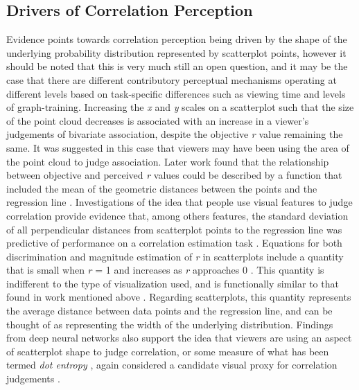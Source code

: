 \documentclass[manuscript, review, anonymous, screen]{acmart}
\begin{document}
\hypertarget{sec-drivers}{%
\subsection{Drivers of Correlation Perception}\label{sec-drivers}}

Evidence points towards correlation perception being driven by the shape
of the underlying probability distribution represented by scatterplot
points, however it should be noted that this is very much still an open
question, and it may be the case that there are different contributory
perceptual mechanisms operating at different levels based on
task-specific differences such as viewing time and levels of
graph-training. Increasing the \emph{x} and \emph{y} scales on a
scatterplot such that the size of the point cloud decreases
\citep{cleveland_1982} is associated with an increase in a viewer's
judgements of bivariate association, despite the objective \emph{r}
value remaining the same. It was suggested in this case that viewers may
have been using the area of the point cloud to judge association. Later
work found that the relationship between objective and perceived
\emph{r} values could be described by a function that included the mean
of the geometric distances between the points and the regression line
\citep{meyer_1997}. Investigations of the idea that people use visual
features to judge correlation provide evidence that, among others
features, the standard deviation of all perpendicular distances from
scatterplot points to the regression line was predictive of performance
on a correlation estimation task \citep{yang_2019}. Equations for both
discrimination and magnitude estimation of \emph{r} in scatterplots
include a quantity that is small when \emph{r} = 1 and increases as
\emph{r} approaches 0 \citep{rensink_2017}. This quantity is indifferent
to the type of visualization used, and is functionally similar to that
found in work mentioned above
\citep{cleveland_1982, meyer_1997, yang_2019}. Regarding scatterplots,
this quantity represents the average distance between data points and
the regression line, and can be thought of as representing the width of
the underlying distribution. Findings from deep neural networks also
support the idea that viewers are using an aspect of scatterplot shape
to judge correlation, or some measure of what has been termed \emph{dot
entropy} \citep{yang_2023}, again considered a candidate visual proxy
for correlation judgements \citep{rensink_2017, rensink_2022}.
\end{document}
